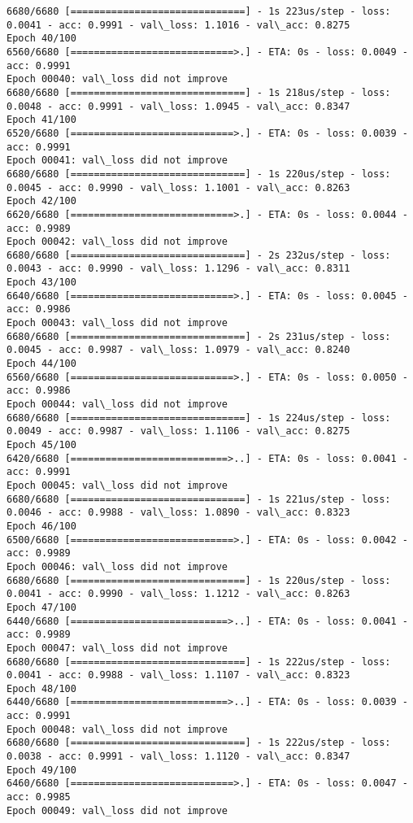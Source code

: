 \documentclass[11pt]{article}
\begin{document}
\begin{Verbatim}[commandchars=\\\{\}]
6680/6680 [==============================] - 1s 223us/step - loss: 0.0041 - acc: 0.9991 - val\_loss: 1.1016 - val\_acc: 0.8275
Epoch 40/100
6560/6680 [============================>.] - ETA: 0s - loss: 0.0049 - acc: 0.9991
Epoch 00040: val\_loss did not improve
6680/6680 [==============================] - 1s 218us/step - loss: 0.0048 - acc: 0.9991 - val\_loss: 1.0945 - val\_acc: 0.8347
Epoch 41/100
6520/6680 [============================>.] - ETA: 0s - loss: 0.0039 - acc: 0.9991
Epoch 00041: val\_loss did not improve
6680/6680 [==============================] - 1s 220us/step - loss: 0.0045 - acc: 0.9990 - val\_loss: 1.1001 - val\_acc: 0.8263
Epoch 42/100
6620/6680 [============================>.] - ETA: 0s - loss: 0.0044 - acc: 0.9989
Epoch 00042: val\_loss did not improve
6680/6680 [==============================] - 2s 232us/step - loss: 0.0043 - acc: 0.9990 - val\_loss: 1.1296 - val\_acc: 0.8311
Epoch 43/100
6640/6680 [============================>.] - ETA: 0s - loss: 0.0045 - acc: 0.9986
Epoch 00043: val\_loss did not improve
6680/6680 [==============================] - 2s 231us/step - loss: 0.0045 - acc: 0.9987 - val\_loss: 1.0979 - val\_acc: 0.8240
Epoch 44/100
6560/6680 [============================>.] - ETA: 0s - loss: 0.0050 - acc: 0.9986
Epoch 00044: val\_loss did not improve
6680/6680 [==============================] - 1s 224us/step - loss: 0.0049 - acc: 0.9987 - val\_loss: 1.1106 - val\_acc: 0.8275
Epoch 45/100
6420/6680 [===========================>..] - ETA: 0s - loss: 0.0041 - acc: 0.9991
Epoch 00045: val\_loss did not improve
6680/6680 [==============================] - 1s 221us/step - loss: 0.0046 - acc: 0.9988 - val\_loss: 1.0890 - val\_acc: 0.8323
Epoch 46/100
6500/6680 [============================>.] - ETA: 0s - loss: 0.0042 - acc: 0.9989
Epoch 00046: val\_loss did not improve
6680/6680 [==============================] - 1s 220us/step - loss: 0.0041 - acc: 0.9990 - val\_loss: 1.1212 - val\_acc: 0.8263
Epoch 47/100
6440/6680 [===========================>..] - ETA: 0s - loss: 0.0041 - acc: 0.9989
Epoch 00047: val\_loss did not improve
6680/6680 [==============================] - 1s 222us/step - loss: 0.0041 - acc: 0.9988 - val\_loss: 1.1107 - val\_acc: 0.8323
Epoch 48/100
6440/6680 [===========================>..] - ETA: 0s - loss: 0.0039 - acc: 0.9991
Epoch 00048: val\_loss did not improve
6680/6680 [==============================] - 1s 222us/step - loss: 0.0038 - acc: 0.9991 - val\_loss: 1.1120 - val\_acc: 0.8347
Epoch 49/100
6460/6680 [============================>.] - ETA: 0s - loss: 0.0047 - acc: 0.9985
Epoch 00049: val\_loss did not improve

\end{Verbatim}
\end{document}
